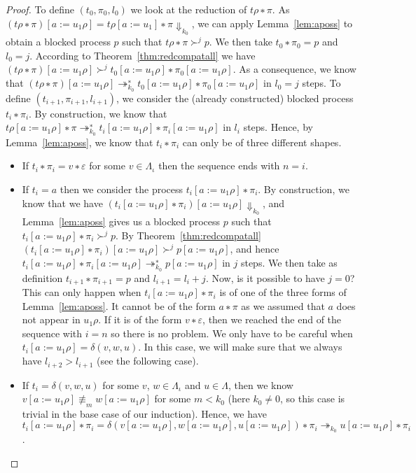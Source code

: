 \begin{proof}
  To define $(t_0,π_0,l_0)$ we look at the reduction of $tρ ∗ π$. As
  ${(tρ∗π)[a := u_1ρ]} = {tρ[a := u_1]∗π} {⇓}_{k_0}$, we can apply
  Lemma~\ref{lem:aposs} to obtain a blocked process $p$ such that
  ${tρ ∗ π} ≻^j p$. We then take ${t_0 ∗ π_0} = p$ and $l_0 = j$.
  According to Theorem~\ref{thm:redcompatall} we have
  ${(tρ ∗ π)[a := u_1ρ]} ≻^j {t_0[a := u_1ρ] ∗ π_0[a := u_1ρ]}$. As a
  consequence, we know that ${(tρ ∗ π)[a := u_1ρ]} ↠_{k_0}^{∗}
  {t_0[a := u_1ρ] ∗ π_0[a := u_1ρ]}$ in $l_0 = j$ steps.
  To define $(t_{i+1},π_{i+1},l_{i+1})$, we consider the (already constructed)
  blocked  process ${t_i ∗ π_i}$. By construction, we know that
  ${tρ[a := u_1ρ] ∗ π} ↠_{k_0}^{∗} {t_i[a := u_1ρ] ∗ π_i[a := u_1ρ]}$ in $l_i$
  steps. Hence, by Lemma~\ref{lem:aposs}, we know that $t_i ∗ π_i$ can only be
  of three different shapes.
  \begin{itemize}
    \item If ${t_i ∗ π_i} = {v ∗ ε}$ for some $v ∈ Λ_ι$ then the sequence ends
      with $n = i$.
    \item If $t_i = a$ then we consider the process ${t_i[a := u_1ρ] ∗ π_i}$.
      By construction, we know that we have
      ${(t_i[a := u_1ρ] ∗ π_i)[a := u_1ρ]} {⇓}_{k_0}$,
      and Lemma~\ref{lem:aposs} gives us a blocked process $p$ such that
      ${t_i[a := u_1ρ] ∗ π_i} ≻^j p$. By Theorem~\ref{thm:redcompatall}
      ${(t_i[a := u_1ρ] ∗ π_i)[a := u_1ρ]} ≻^j {p[a := u_1ρ]}$, and hence
      ${t_i[a := u_1ρ] ∗ π_i[a := u_1ρ]} ↠_{k_0}^{∗} {p[a := u_1ρ]}$ in $j$
      steps. We then take as definition ${t_{i+1} ∗ π_{i+1}} = p$ and
      $l_{i+1} = l_i + j$.
      Now, is it possible to have $j = 0$? This can only happen when
      ${t_i[a := u_1ρ] ∗ π_i}$ is of one of the three forms of
      Lemma~\ref{lem:aposs}. It cannot be of the form ${a ∗ π}$ as we assumed
      that $a$ does not appear in $u_1ρ$. If it is of the form $v ∗ ε$, then
      we reached the end of the sequence with $i = n$ so there is no problem.
      We only have to be careful when ${t_i[a := u_1ρ]} = {δ(v,w,u)}$. In
      this case, we will make sure that we always have $l_{i+2} > l_{i+1}$
      (see the following case).
    \item If $t_i = {δ(v,w,u)}$ for some $v$, $w ∈ Λ_ι$ and $u ∈ Λ$, then we
      know ${v[a := u_1ρ]} \not\equiv_m {w[a := u_1ρ]}$ for some $m < k_0$
      (here $k_0 ≠ 0$, so this case is trivial in the base case of our
      induction). Hence, we have ${t_i[a := u_1ρ] ∗ π_i} = {δ(v[a := u_1ρ],
      w[a := u_1ρ], u[a := u_1ρ]) ∗ π_i} ↠_{k_0} {u[a := u_1ρ] ∗ π_i}$.

\end{itemize}
\end{proof}
